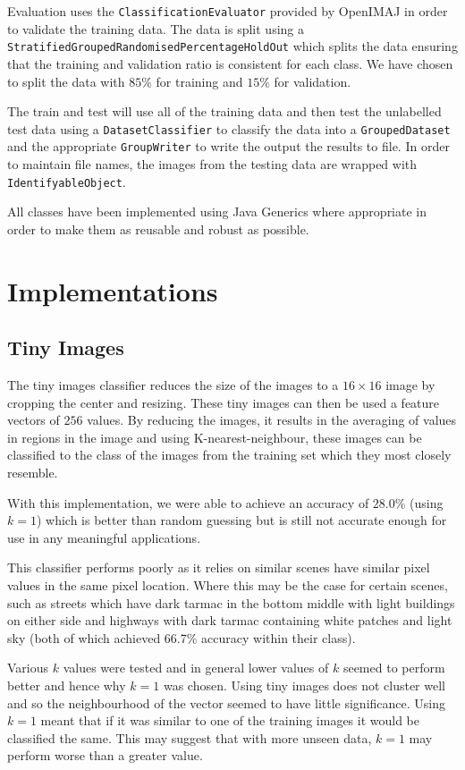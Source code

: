 \documentclass[paper=a4, fontsize=11pt]{article}
\begin{document}
Evaluation uses the \texttt{ClassificationEvaluator} provided by OpenIMAJ in order to validate the training data. The data is split using a \texttt{StratifiedGroupedRandomisedPercentageHoldOut} which splits the data ensuring that the training and validation ratio is consistent for each class. We have chosen to split the data with $85\%$ for training and $15\%$ for validation.

The train and test will use all of the training data and then test the unlabelled test data using a \texttt{DatasetClassifier} to classify the data into a \texttt{GroupedDataset} and the appropriate \texttt{GroupWriter} to write the output the results to file. In order to maintain file names, the images from the testing data are wrapped with \texttt{IdentifyableObject}.

All classes have been implemented using Java Generics where appropriate in order to make them as reusable and robust as possible.

\section{Implementations}

\subsection{Tiny Images}

The tiny images classifier reduces the size of the images to a $16 \times 16$ image by cropping the center and resizing. These tiny images can then be used a feature vectors of $256$ values. By reducing the images, it results in the averaging of values in regions in the image and using K-nearest-neighbour, these images can be classified to the class of the images from the training set which they most closely resemble.

With this implementation, we were able to achieve an accuracy of $28.0\%$ (using $k=1$) which is better than random guessing but is still not accurate enough for use in any meaningful applications.

This classifier performs poorly as it relies on similar scenes have similar pixel values in the same pixel location. Where this may be the case for certain scenes, such as streets  which have dark tarmac in the bottom middle with light buildings on either side and highways with dark tarmac containing white patches and light sky (both of which achieved 66.7\% accuracy within their class).

Various $k$ values were tested and in general lower values of $k$ seemed to perform better and hence why $k=1$ was chosen. Using tiny images does not cluster well and so the neighbourhood of the vector seemed to have little significance. Using $k=1$ meant that if it was similar to one of the training images it would be classified the same. This may suggest that with more unseen data, $k=1$ may perform worse than a greater value.
\end{document}
